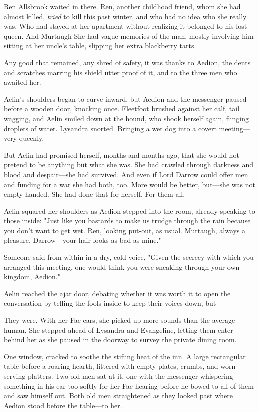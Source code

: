 Ren Allsbrook waited in there. Ren, another childhood friend, whom she had almost killed, \emph{tried} to kill this past winter, and who had no idea who she really was. Who had stayed at her apartment without realizing it belonged to his lost queen. And Murtaugh  She had vague memories of the man, mostly involving him sitting at her uncle's table, slipping her extra blackberry tarts.

Any good that remained, any shred of safety, it was thanks to Aedion, the dents and scratches marring his shield utter proof of it, and to the three men who awaited her.

Aelin's shoulders began to curve inward, but Aedion and the messenger paused before a wooden door, knocking once. Fleetfoot brushed against her calf, tail wagging, and Aelin smiled down at the hound, who shook herself again, flinging droplets of water. Lysandra snorted. Bringing a wet dog into a covert meeting---very queenly.

But Aelin had promised herself, months and months ago, that she would not pretend to be anything but what she was. She had crawled through darkness and blood and despair---she had survived. And even if Lord Darrow could offer men and funding for a war  she had both, too. More would be better, but---she was not empty-handed. She had done that for herself. For them all.

Aelin squared her shoulders as Aedion stepped into the room, already speaking to those inside: "Just like you bastards to make us trudge through the rain because you don't want to get wet. Ren, looking put-out, as usual. Murtaugh, always a pleasure. Darrow---your hair looks as bad as mine."

Someone said from within in a dry, cold voice, "Given the secrecy with which you arranged this meeting, one would think you were sneaking through your own kingdom, Aedion."

Aelin reached the ajar door, debating whether it was worth it to open the conversation by telling the fools inside to keep their voices down, but---

They were. With her Fae ears, she picked up more sounds than the average human. She stepped ahead of Lysandra and Evangeline, letting them enter behind her as she paused in the doorway to survey the private dining room.

One window, cracked to soothe the stifling heat of the inn. A large rectangular table before a roaring hearth, littered with empty plates, crumbs, and worn serving platters. Two old men sat at it, one with the messenger whispering something in his ear too softly for her Fae hearing before he bowed to all of them and saw himself out. Both old men straightened as they looked past where Aedion stood before the table---to her.

